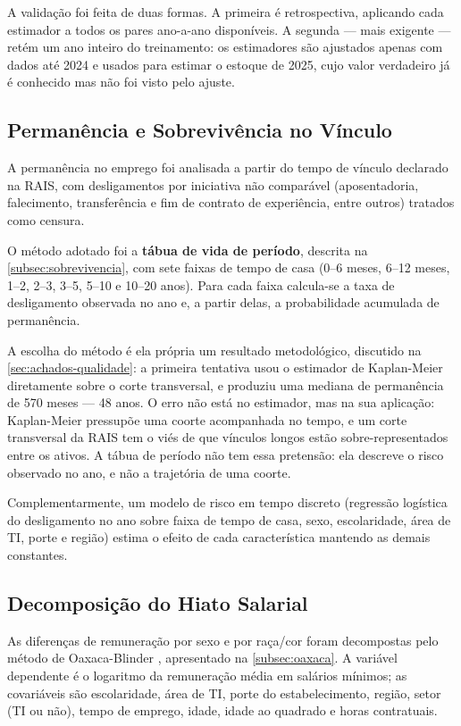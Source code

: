 A validação foi feita de duas formas. A primeira é retrospectiva, aplicando cada estimador a todos os pares ano-a-ano disponíveis. A segunda --- mais exigente --- retém um ano inteiro do treinamento: os estimadores são ajustados apenas com dados até 2024 e usados para estimar o estoque de 2025, cujo valor verdadeiro já é conhecido mas não foi visto pelo ajuste.

\subsection{Permanência e Sobrevivência no Vínculo}
\label{subsec:metodo-sobrevivencia}

A permanência no emprego foi analisada a partir do tempo de vínculo declarado na RAIS, com desligamentos por iniciativa não comparável (aposentadoria, falecimento, transferência e fim de contrato de experiência, entre outros) tratados como censura.

O método adotado foi a \textbf{tábua de vida de período}, descrita na \autoref{subsec:sobrevivencia}, com sete faixas de tempo de casa (0--6 meses, 6--12 meses, 1--2, 2--3, 3--5, 5--10 e 10--20 anos). Para cada faixa calcula-se a taxa de desligamento observada no ano e, a partir delas, a probabilidade acumulada de permanência.

A escolha do método é ela própria um resultado metodológico, discutido na \autoref{sec:achados-qualidade}: a primeira tentativa usou o estimador de Kaplan-Meier \cite{Kaplan1958} diretamente sobre o corte transversal, e produziu uma mediana de permanência de 570 meses --- 48 anos. O erro não está no estimador, mas na sua aplicação: Kaplan-Meier pressupõe uma coorte acompanhada no tempo, e um corte transversal da RAIS tem o viés de que vínculos longos estão sobre-representados entre os ativos. A tábua de período não tem essa pretensão: ela descreve o risco observado no ano, e não a trajetória de uma coorte.

Complementarmente, um modelo de risco em tempo discreto (regressão logística do desligamento no ano sobre faixa de tempo de casa, sexo, escolaridade, área de TI, porte e região) estima o efeito de cada característica mantendo as demais constantes.

\subsection{Decomposição do Hiato Salarial}
\label{subsec:metodo-oaxaca}

As diferenças de remuneração por sexo e por raça/cor foram decompostas pelo método de Oaxaca-Blinder \cite{Oaxaca1973, Blinder1973}, apresentado na \autoref{subsec:oaxaca}. A variável dependente é o logaritmo da remuneração média em salários mínimos; as covariáveis são escolaridade, área de TI, porte do estabelecimento, região, setor (TI ou não), tempo de emprego, idade, idade ao quadrado e horas contratuais.

